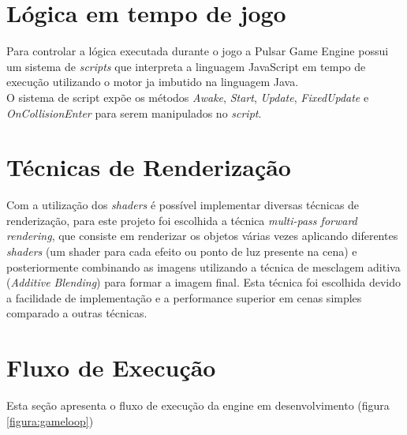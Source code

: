 \documentclass[12pt,	openright, twoside,	a4paper, english, french, spanish, brazil]{abntex2}
\begin{document}
\section{Lógica em tempo de jogo}

Para controlar a lógica executada durante o jogo a Pulsar Game Engine possui um sistema de \textit{scripts} que interpreta a linguagem JavaScript em tempo de execução utilizando o motor ja imbutido na linguagem Java. \\
O sistema de script expõe os métodos \textit{Awake}, \textit{Start}, \textit{Update}, \textit{FixedUpdate} e \textit{OnCollisionEnter} para serem manipulados no \textit{script}.

%
%

\section{Técnicas de Renderização}

Com a utilização dos \textit{shaders} é possível implementar diversas técnicas de renderização, para este projeto foi escolhida a técnica \textit{multi-pass forward rendering}, que consiste em renderizar os objetos várias vezes aplicando diferentes \textit{shaders} (um shader para cada efeito ou ponto de luz presente na cena) e posteriormente combinando as imagens utilizando a técnica de mesclagem aditiva (\textit{Additive Blending}) para formar a imagem final. Esta técnica foi escolhida devido a facilidade de implementação e a performance superior em cenas simples comparado a outras técnicas.

%
%

\section{Fluxo de Execução}
Esta seção apresenta o fluxo de execução da engine em desenvolvimento (figura \ref{figura:gameloop})
\end{document}

